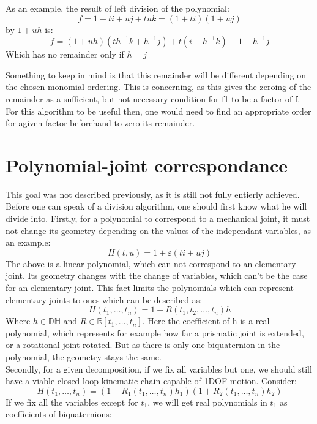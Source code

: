 As an example, the result of left division of the polynomial:
\begin{equation}
    f = 1 +ti + uj + tuk = (1 + ti)(1+uj)
\end{equation}
by $1+uh$ is:
\begin{equation}
    f= (1+uh)(th^{-1}k + h^{-1}j) + t(i - h^{-1}k) + 1 - h^{-1}j
\end{equation}
Which has no remainder only if $h = j$

Something to keep in mind is that this remainder will be different depending on the chosen monomial ordering. This is concerning, as this gives the zeroing of the remainder as a sufficient, but not necessary condition for f1 to be a factor of f. For this algorithm to be useful then, one would need to find an appropriate order for agiven factor beforehand to zero its remainder. 


\section{Polynomial-joint correspondance}
This goal was not described previously, as it is still not fully entierly achieved. Before one can speak of a division algorithm, one should first know what he will divide into. Firstly, for a polynomial to correspond to a mechanical joint, it must not change its geometry depending on the values of the independant variables, as an example:
\begin{equation}
    H(t,u) = 1+\varepsilon( t i + u j)
\end{equation}
The above is a linear polynomial, which can not correspond to an elementary joint. Its geometry changes with the change of variables, which can't be the case for an elementary joint. This fact limits the polynomials which
can represent elementary joints to ones which can be described as:
\begin{equation}
    H(t_1,\dots,t_n) = 1 +R(t_1,t_2,\dots ,t_n)h
\end{equation}
Where $h \in \mathbb{DH}$ and $R \in \mathbb{R}[t_1,\dots ,t_n]$. Here the coefficient of h is a real polynomial, which represents for example how far a prismatic joint is extended, or a rotational joint rotated. But as there is only one biquaternion in the polynomial, the geometry stays the same.\\

Secondly, for a given decomposition, if we fix all variables but one, we should still have a viable closed loop kinematic chain capable of 1DOF motion. Consider:
\begin{equation}
    H(t_1,\dots,t_n) = (1+R_1(t_1,\dots,t_n)h_1)(1+R_2(t_1,\dots,t_n)h_2)
\end{equation}
If we fix all the variables except for $t_1$, we will get real polynomials in  $t_1$ as coefficients of biquaternions:

